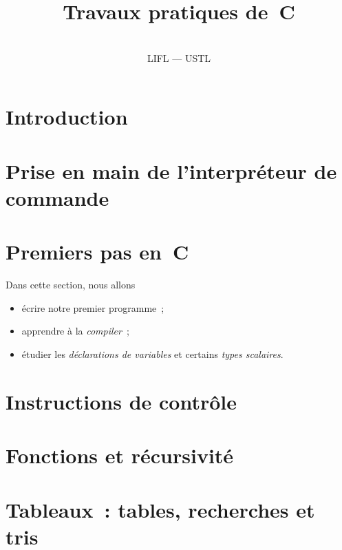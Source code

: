 \documentclass[12pt,draft]{book}
\title{Travaux pratiques de~C}
\author{\email{Alexandre Sedoglavic}{Alexandre.Sedoglavic@univ-lille1.fr}\\
  LIFL --- USTL }
\begin{document}
\maketitle%
\chapter*{Introduction}
\label{cha:Introduction} 

\chapter{Prise en main de l'interpr\'eteur de commande}
\label{cha:Shell}

\chapter{Premiers pas en~C}
\label{cha:PremierPas}
Dans cette section, nous allons
\begin{itemize}
\item \'ecrire notre premier programme~;
\item apprendre \`a la \textit{compiler}~;
\item \'etudier  les \textit{d\'eclarations  de variables} et certains
  \textit{types scalaires}.
\end{itemize}

\chapter{Instructions de contr\^ole}
\label{cha:InstructionDeControle}

\chapter{Fonctions et r\'ecursivit\'e}
\label{cha:Recursivite}

\chapter{Tableaux~: tables, recherches et tris}
\label{cha:Tableaux}

\end{document}
